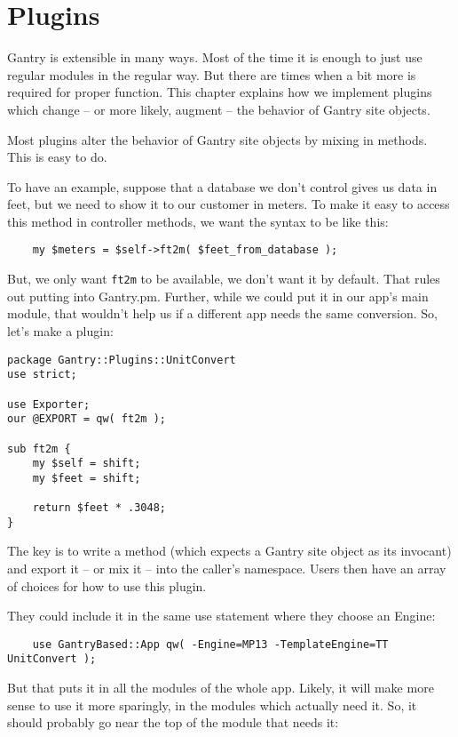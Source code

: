 \chapter{Plugins}
\label{chap:plugins}

Gantry is extensible in many ways.  Most of the time it is enough to just
use regular modules in the regular way.  But there are times when a bit
more is required for proper function.  This chapter explains how we
implement plugins which change -- or more likely, augment -- the behavior
of Gantry site objects.

Most plugins alter the behavior of Gantry site objects by mixing in
methods.  This is easy to do.

To have an example, suppose that a database we don't control gives us
data in feet, but we need to show it to our customer in meters.  To make
it easy to access this method in controller methods, we want the syntax
to be like this:

\begin{verbatim}
    my $meters = $self->ft2m( $feet_from_database );
\end{verbatim}

But, we only want \verb+ft2m+ to be available, we don't want it by default.
That rules out putting into Gantry.pm.  Further, while we could put it in
our app's main module, that wouldn't help us if a different app needs the
same conversion.  So, let's make a plugin:

\begin{verbatim}
package Gantry::Plugins::UnitConvert
use strict;

use Exporter;
our @EXPORT = qw( ft2m );

sub ft2m {
    my $self = shift;
    my $feet = shift;

    return $feet * .3048;
}
\end{verbatim}

The key is to write a method (which expects a Gantry site object as its
invocant) and export it -- or mix it -- into the caller's namespace.
Users then have an array of choices for how to use this plugin.

They could include it in the same use statement where they choose an Engine:

\begin{verbatim}
    use GantryBased::App qw( -Engine=MP13 -TemplateEngine=TT UnitConvert );
\end{verbatim}

But that puts it in all the modules of the whole app.  Likely, it will make
more sense to use it more sparingly, in the modules which actually need it.
So, it should probably go near the top of the module that needs it:

